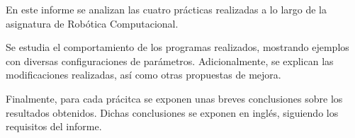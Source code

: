 
En este informe se analizan las cuatro prácticas realizadas a lo largo de la asignatura de Robótica Computacional. 

\bigskip Se estudia el comportamiento de los programas realizados, mostrando ejemplos con diversas configuraciones de parámetros. Adicionalmente, se explican las modificaciones realizadas, así como otras propuestas de mejora. 

\bigskip Finalmente, para cada prácitca se exponen unas breves conclusiones sobre los resultados obtenidos. Dichas conclusiones se exponen en inglés, siguiendo los requisitos del informe.
